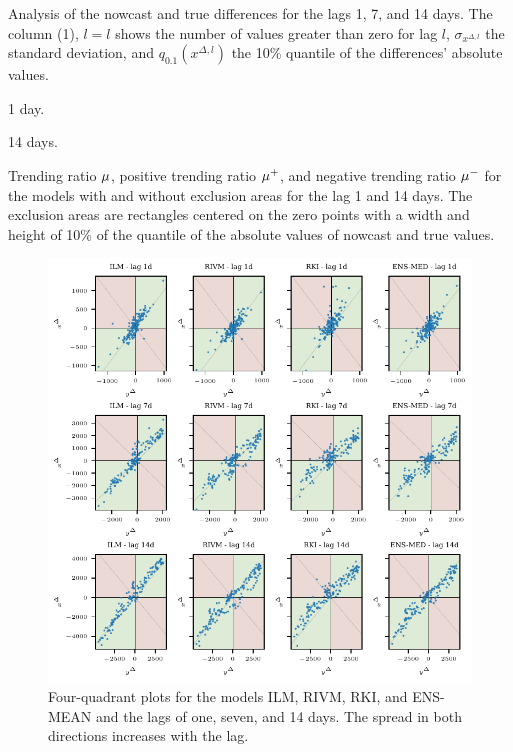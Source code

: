 \begin{table}
    \centering
    \tiny
    
    \caption{Analysis of the nowcast and true differences for the lags 1, 7, and 14 days.
    The column (1), $l=l$ shows the number of values greater than zero for lag $l$, $\sigma_{x^{\Delta, l}}$ the standard deviation, and $q_{0.1} (x^{\Delta, l})$ the 10\% quantile of the differences' absolute values.}
    \label{tab:app-covid-marginals}
\end{table}

\begin{table}
    \centering
    \begin{subtable}[t]{\textwidth}
        
    \caption{1 day.}
    \end{subtable}
    \begin{subtable}[t]{\textwidth}
        
        \caption{14 days.}
    \end{subtable}
    \caption{Trending ratio $\mu$, positive trending ratio $\mu^+$, and negative trending ratio $\mu^-$ for the models with and without exclusion areas for the lag 1 and 14 days. The exclusion areas are rectangles centered on the zero points with a width and height of 10\% of the quantile of the absolute values of nowcast and true values. }
    \label{tab:app-covid-trending-ratios-lag-1-14}
\end{table}



\begin{figure}
\centering
\includegraphics{plots/covid_nowcast/30_4q_plots}
\caption{Four-quadrant plots for the models ILM, RIVM, RKI, and ENS-MEAN and the lags of one, seven, and 14 days. The spread in both directions increases with the lag. }
\label{fig:app-covid-4q}
\end{figure}


